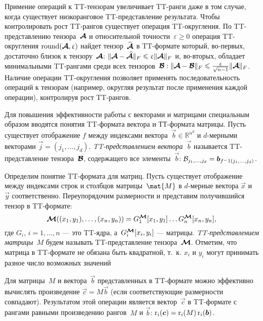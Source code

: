 Примение операций к TT\hyp{}тензорам увеличивает TT\hyp{}ранги даже в том случае, когда существует низкоранговое TT\hyp{}представление результата. Чтобы контролировать рост TT\hyp{}рангов существует операция TT\hyp{}округления.
По TT\hyp{}представлению тензора~$\boldsymbol{\mathcal{A}}$ и относительной точности~$\varepsilon \geq 0$ операция TT\hyp{}округления $\operatorname{round}(\boldsymbol{\mathcal{A}},\upvarepsilon)$ найдет тензор~$\widehat{\boldsymbol{\mathcal{A}}}$ в TT\hyp{}формате который, во-первых, достаточно близок к тензору~$\boldsymbol{\mathcal{A}}$: $\| \boldsymbol{\mathcal{A}} - \boldsymbol{\mathcal{\widehat{A}}} \|_F \leqslant \upvarepsilon  \| \boldsymbol{\mathcal{A}}  \|_F$ и, во-вторых, обладает минимальными TT\hyp{}рангами среди всех тензоров~$\boldsymbol{\mathcal{B}}: \| \boldsymbol{\mathcal{A}} - \boldsymbol{\mathcal{B}} \|_F \leqslant \frac{\upvarepsilon}{\sqrt{n - 1}}  \| \boldsymbol{\mathcal{A}}  \|_F$. Наличие операции TT\hyp{}округления позволяет применять последовательность операций к тензорам (например, округляя результат после применения каждой операции), контролируя рост TT\hyp{}рангов.


Для повышения эффективности работы с векторами и матрицами специальным образом вводятся понятия TT\hyp{}формата вектора и ТТ\hyp{}формата матрицы.
Пусть существует отображение $f$ между индексами вектора~$\vec{b}\in\mathbb{R}^{n^d}$ и $d$-мерными векторами $\vec{j} = (j_1, \dots, j_d)$.%
\emph{TT\hyp{}представлением вектора~$\vec{b}$} называется TT\hyp{}представление тензора~$\boldsymbol{\mathcal{B}}$, содержащего все элементы~$\vec{b}$: $\mathcal{B}_{j_1, \dots, j_d} = \boldsymbol{b}_{f^-1(j_1, \dots, j_d)}$.


Определим понятие TT\hyp{}формата для матриц. Пусть существует отображение между индексами строк и столбцов матрицы~$\mat{M}$ в $d$-мерные вектора $\vec{x}$ и $\vec{y}$ соответственно. Переупорядочим размерности и представим получившийся тензор в TT\hyp{}формате:
\begin{equation*}
\boldsymbol{\mathcal{M}}((x_1, y_1),\ldots,(x_n,y_n))=G_1^{\boldsymbol{\mathcal{M}}}[x_1,y_1]\dots G_n^{\boldsymbol{\mathcal{M}}}[x_n,y_n],
\end{equation*}
где $G_i$, $i = 1,\dots,n$ --- это TT\hyp{}ядра, а~$G_i^{\boldsymbol{\mathcal{M}}}[x_i,y_i]$ --- матрицы. \emph{TT\hyp{}представлением матрицы~$M$} будем называть TT\hyp{}представление тензора~$\boldsymbol{\mathcal{M}}$. Отметим, что матрица в TT\hyp{}формате не обязана быть квадратной, т.~к. $x_i$ и $y_i$ могут принимать разное число возможных значений


Для матрицы~$M$ и вектора~$\vec{b}$ представленных в TT\hyp{}формате можно эффективно вычислять произведение $\vec{c}=M\vec{b}$ (если соответствующие размерности совпадают). Результатом этой операции является вектор~$\vec{c}$ в TT\hyp{}формате с рангами равными произведению рангов~$M$ и $\vec{b}$: $\operatorname{r}_i(\boldsymbol{c}) = \operatorname{r}_i(M) \operatorname{r}_i(\boldsymbol{b})$.

